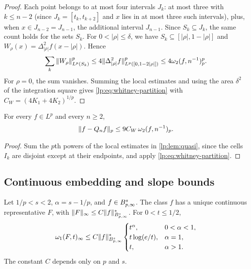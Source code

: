 \documentclass[11pt,a4paper]{article}
\begin{document}
\begin{proof}
Each point belongs to at most four intervals $J_k$: at most three with $k\le n-2$ (since $J_k=[t_k,t_{k+2}]$ and $x$ lies in at most three such intervals), plus, when $x\in J_{n-2}=J_{n-1}$, the additional interval $J_{n-1}$. Since $S_k\subseteq J_k$, the same count holds for the sets $S_k$. For $0<|\rho|\le\delta$, we have $S_k\subseteq[|\rho|,1-|\rho|]$ and $W_\rho(x)=\Delta_{|\rho|}^2f(x-|\rho|)$. Hence
\[
 \sum_k\|W_\rho\|_{L^p(S_k)}^p
 \le4\|\Delta_{|\rho|}^2f\|_{L^p([0,1-2|\rho|])}^p
 \le4\omega_2(f,n^{-1})_{p}^p .
\]
For $\rho=0$, the sum vanishes. Summing the local estimates and using the area $\delta^2$ of the integration square gives \eqref{lp:eq:whitney-partition} with
$C_W=(4K_1+4K_2)^{1/p}$.
\end{proof}

\begin{corolario}
\label{lp:cor:quasi-error}
For every $f\in L^p$ and every $n\ge2$,
\begin{equation}
 \|f-Q_nf\|_p\le9C_W\,\omega_2(f,n^{-1})_{p}.
 \label{lp:eq:quasi-error}
\end{equation}
\end{corolario}

\begin{proof}
Sum the $p$th powers of the local estimates in \cref{lp:lem:quasi}, since the cells $I_k$ are disjoint except at their endpoints, and apply \eqref{lp:eq:whitney-partition}.
\end{proof}

\subsection{Continuous embedding and slope bounds}

\begin{lema}
\label{lp:lem:embedding}
Let $1/p<s<2$, $\alpha=s-1/p$, and $f\in B^{s}_{p,\infty}$. The class $f$ has a unique continuous representative $F$, with
$\|F\|_\infty\le C\|f\|^*_{B^{s}_{p,\infty}}$. For $0<t\le1/2$,
\begin{equation}
 \omega_1(F,t)_\infty
 \le C\|f\|^*_{B^{s}_{p,\infty}}
 \begin{cases}
 t^\alpha,&0<\alpha<1,\\
 t\log(e/t),&\alpha=1,\\
 t,&\alpha>1.
 \end{cases}
 \label{lp:eq:omega1-regimes}
\end{equation}
The constant $C$ depends only on $p$ and $s$.
\end{lema}
\end{document}
